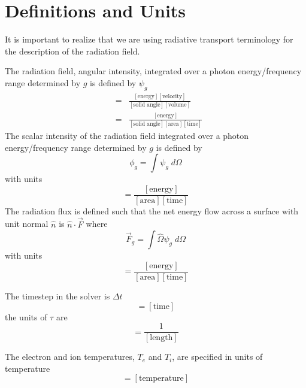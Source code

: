 \documentclass{article}
\newcommand{\units}[1]{\ensuremath{[\mbox{#1}]}}
\begin{document}
\section{Definitions and Units}

It is important to realize that we are using radiative transport terminology
for the description of the radiation field.

The radiation field, angular intensity, integrated over 
a photon energy/frequency range determined by $g$ is defined by $\psi_{g}$
\begin{eqnarray}
     [\psi_{g}] &=& \frac{\units{energy} \units{velocity}}
                         {\units{solid angle} \units{volume}} \\
                &=& \frac{\units{energy}}
                         {\units{solid angle} \units{area} \units{time}}
\end{eqnarray}
The scalar intensity of the radiation field integrated over 
a photon energy/frequency range determined by $g$ is defined by
\begin{equation}
        \phi_{g} = \int \psi_{g} \; d\Omega
\end{equation}
with units
\begin{equation}
        [\phi_{g}] = \frac{\units{energy}}
                          {\units{area} \units{time}}
\end{equation}
The radiation flux is defined such that the net energy flow across
a surface with unit normal $\hat{n}$ is $\hat{n} \cdot \vec{F}$
where
\begin{equation}
        \vec{F}_{g} = \int \hat{\Omega} \psi_{g} \; d\Omega
\end{equation}
with units
\begin{equation}
        [\vec{F}_{g}] = \frac{\units{energy}}
                         {\units{area}\units{time}}
\end{equation}

The timestep in the solver is $\Delta t$
\begin{equation}
        [\Delta t] = \units{time}
\end{equation}
the units of $\tau$ are
\begin{equation}
        [\tau] = \frac{1}{\units{length}}
\end{equation}

The electron and ion temperatures, $T_{e}$ and $T_{i}$, are specified
in units of temperature
\begin{equation}
        [T] = \units{temperature}
\end{equation}
\end{document}

